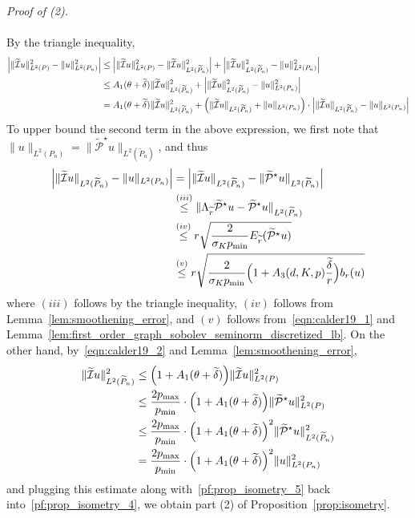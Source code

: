\documentclass{article}
\newcommand{\1}{\mathbf{1}}
\newcommand{\Leb}{L}
\newcommand{\mc}[1]{\mathcal{#1}}
\newcommand{\wt}[1]{\widetilde{#1}}
\theoremstyle{alden}
\theoremstyle{aldenthm}
\theoremstyle{definition}
\theoremstyle{remark}
\begin{document}
\textit{Proof of (2).}
\mbox{}\\
\mbox{}\\

By the triangle inequality,
\begin{align}
\Bigl|\|\wt{\mc{I}}u\|_{\Leb^2(P)}^2 - \|u\|_{\Leb^2(P_n)}^2\Bigr| & \leq \Bigl|\|\wt{\mc{I}}u\|_{\Leb^2(P)}^2 - \|\wt{\mc{I}}u\|_{\Leb^2(\wt{P}_n)}^2\Bigr| + \Bigl|\|\wt{\mc{I}}u\|_{\Leb^2(\wt{P}_n)}^2 - \|u\|_{\Leb^2(P_n)}^2\Bigr| \nonumber \\
& \leq A_1(\theta + \wt{\delta}) \|\wt{\mc{I}}u\|_{\Leb^2(\wt{P}_n)}^2 + \Bigl|\|\wt{\mc{I}}u\|_{\Leb^2(\wt{P}_n)}^2 - \|u\|_{\Leb^2(P_n)}^2\Bigr| \nonumber\\
& = A_1(\theta + \wt{\delta}) \|\wt{\mc{I}}u\|_{\Leb^2(\wt{P}_n)}^2 + \Bigl(\|\wt{\mc{I}}u\|_{\Leb^2(\wt{P}_n)} + \|u\|_{\Leb^2(P_n)}\Bigr) \cdot \Bigl|\|\wt{\mc{I}}u\|_{\Leb^2(\wt{P}_n)} - \|u\|_{\Leb^2(P_n)}\Bigr| \label{pf:prop_isometry_4}
\end{align}
To upper bound the second term in the above expression, we first note that~$\|u\|_{\Leb^2(P_n)} = \|\wt{\mc{P}}^{\star}u\|_{\Leb^2(\wt{P}_n)}$, and thus
\begin{align}
\Bigl|\|\wt{\mc{I}}u\|_{\Leb^2(\wt{P}_n)} - \|u\|_{\Leb^2(P_n)} \Bigr| & = \Bigl|\|\wt{\mc{I}}u\|_{\Leb^2(\wt{P}_n)} - \|\wt{\mc{P}}^{\star}u\|_{\Leb^2(\wt{P}_n)}\Bigr| \nonumber \\
& \overset{(iii)}{\leq} \|\Lambda_{\wt{r}}\wt{\mc{P}}^{\star}u - \wt{\mc{P}}^{\star}u\|_{\Leb^2(\wt{P}_n)} \nonumber \\
& \overset{(iv)}{\leq} r \sqrt{\frac{2}{\sigma_K p_{\min}} E_{\wt{r}}(\wt{\mc{P}}^{\star}u)} \nonumber \\
& \overset{(v)}{\leq} r \sqrt{\frac{2}{\sigma_K p_{\min}} \Bigl(1 + A_3(d,K,p)\frac{\wt{\delta}}{r}\Bigr) b_r(u)} \label{pf:prop_isometry_5}
\end{align}
where $(iii)$ follows by the triangle inequality, $(iv)$ follows from Lemma~\ref{lem:smoothening_error}, and $(v)$ follows from~\eqref{eqn:calder19_1} and Lemma~\ref{lem:first_order_graph_sobolev_seminorm_discretized_lb}. On the other hand, by~\eqref{eqn:calder19_2} and Lemma~\ref{lem:smoothening_error},
\begin{align*}
\|\wt{\mc{I}}u\|_{\Leb^2(\wt{P}_n)}^2 & \leq \Bigl(1 + A_1(\theta + \wt{\delta})\Bigr) \|\wt{\mc{I}}u\|_{\Leb^2(P)}^2 \\
& \leq \frac{2p_{\max}}{p_{\min}} \cdot \Bigl(1 + A_1(\theta + \wt{\delta})\Bigr) \|\wt{\mc{P}}^{\star}u\|_{\Leb^2(P)}^2 \\
& \leq \frac{2p_{\max}}{p_{\min}} \cdot \Bigl(1 + A_1(\theta + \wt{\delta})\Bigr)^2 \|\wt{\mc{P}}^{\star}u\|_{\Leb^2(\wt{P}_n)}^2 \\
& = \frac{2p_{\max}}{p_{\min}} \cdot \Bigl(1 + A_1(\theta + \wt{\delta})\Bigr)^2 \|u\|_{\Leb^2(P_n)}^2
\end{align*}
and plugging this estimate along with~\eqref{pf:prop_isometry_5} back into~\eqref{pf:prop_isometry_4}, we obtain part (2) of Proposition~\ref{prop:isometry}.
\end{document}
